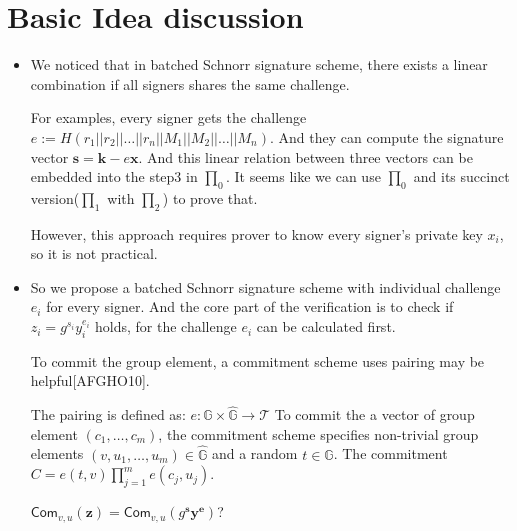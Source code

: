 \documentclass[11pt,a4]{article}
\newcommand{\Com}{\mathsf{Com}}
\newcommand{\group}{\mathbb{G}}
\begin{document}
\section{Basic Idea discussion}

\begin{itemize}
    \item We noticed that in batched Schnorr signature scheme, there exists a linear combination if all signers shares the same challenge. 

    For examples, every signer gets the challenge $e:=H(r_1\vert \vert r_2 \vert \vert \ldots \vert \vert r_n \vert \vert M_1 \vert \vert M_2 \vert \vert \ldots \vert \vert M_n)$. And they can compute the signature vector $\textbf{s} = \textbf{k}-e\textbf{x}$. And this linear relation between three vectors can be embedded into the step3 in $\prod_0$. It seems like we can use $\prod_0$ and its succinct version($\prod_1$ with $\prod_2$) to prove that.

    However, this approach requires prover to know every signer's private key $x_i$, so it is not practical.
    \item So we propose a batched Schnorr signature scheme with individual challenge $e_i$ for every signer. And the core part of the verification is to check if $z_i=g^{s_i}y_i^{e_i}$ holds, for the challenge $e_i$ can be calculated first.

    To commit the group element, a commitment scheme uses pairing may be helpful[AFGHO10]. 

    The pairing is defined as: $e: \group \times \hat{\group} \rightarrow \mathcal{T}$
    To commit the a vector of group element $(c_1, \ldots, c_m)$, the commitment scheme specifies non-trivial group elements $(v, u_1, \ldots, u_m) \in \hat{\group}$ and a random $t \in \group$.
    The commitment $C=e(t,v)\prod_{j=1}^me(c_j,u_j)$.


    $\Com_{v,u}(\textbf{z})=\Com_{v,u}(g^\textbf{s}\textbf{y}^\textbf{e})$?

\end{itemize}
\end{document}
